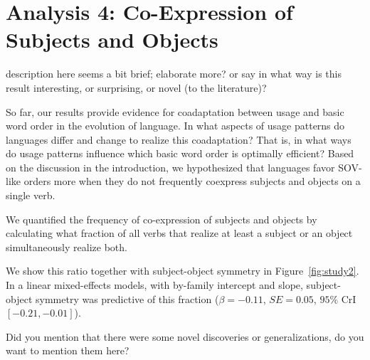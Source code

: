 \documentclass[11pt,a4paper]{article}
\newcommand\comment[1]{{\color{red}#1}}
\newcommand\mhahn[1]{{\color{red}(#1)}}
\begin{document}
\section{Analysis 4: Co-Expression of Subjects and Objects}

\comment{description here seems a bit brief; elaborate more? or say in what way is this result interesting, or surprising, or novel (to the literature)?}

So far, our results provide evidence for coadaptation between usage and basic word order in the evolution of language.
In what aspects of usage patterns do languages differ and change to realize this coadaptation?
That is, in what ways do usage patterns influence which basic word order is optimally efficient?
Based on the discussion in the introduction, we hypothesized that languages favor SOV-like orders more when they do not frequently coexpress subjects and objects on a single verb.

We quantified the frequency of co-expression of subjects and objects by calculating what fraction of all verbs that realize at least a subject or an object simultaneously realize both.

We show this ratio together with subject-object symmetry in Figure~\ref{fig:study2}.
In a linear mixed-effects models, with by-family intercept and slope, subject-object symmetry was predictive of this fraction ($\beta=-0.11$, $SE=0.05$, $95\%$ CrI $[-0.21, -0.01]$).


{\color{blue}Did you mention that there were some novel discoveries or generalizations, do you want to mention them here?}
\end{document}
